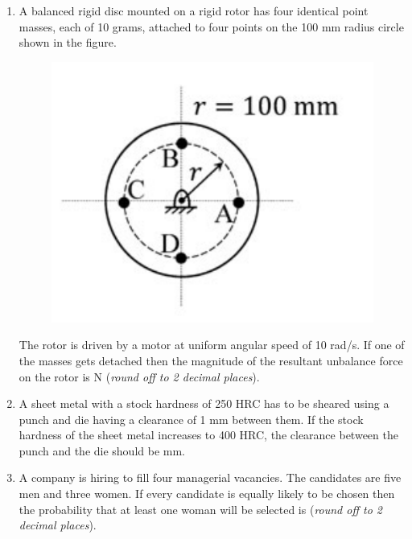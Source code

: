 \documentclass[12pt,onecolumn]{article}
\begin{document}
\begin{enumerate}
    \item A balanced rigid disc mounted on a rigid rotor has four identical point masses, each of 10 grams, attached to four points on the 100 mm radius circle shown in the figure.
          \begin{figure}[H]
              \centering
              \includegraphics[scale=0.3]{q21}
              \label{fig:q21}
          \end{figure}
          The rotor is driven by a motor at uniform angular speed of 10 rad/s. If one of the masses gets detached then the magnitude of the resultant unbalance force on the rotor is \underline{\hspace{2cm}} N (\textit{round off to 2 decimal places}).

    \item A sheet metal with a stock hardness of 250 HRC has to be sheared using a punch and die having a clearance of 1 mm between them. If the stock hardness of the sheet metal increases to 400 HRC, the clearance between the punch and the die should be \underline{\hspace{2cm}} mm.

    \item A company is hiring to fill four managerial vacancies. The candidates are five men and three women. If every candidate is equally likely to be chosen then the probability that at least one woman will be selected is \underline{\hspace{2cm}} (\textit{round off to 2 decimal places}).


\end{enumerate}
\end{document}
